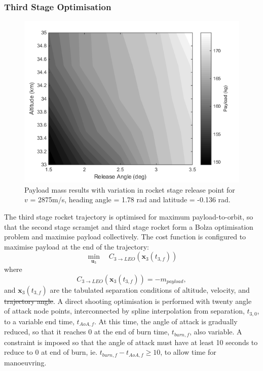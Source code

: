 \documentclass[journal]{new-aiaa}
\providecommand{\DIFadd}[1]{{\protect\color{blue}\uwave{#1}}} %
\providecommand{\DIFdel}[1]{{\protect\color{red}\sout{#1}}}                      %
\providecommand{\DIFaddbegin}{} %
\providecommand{\DIFaddend}{} %
\providecommand{\DIFdelbegin}{} %
\providecommand{\DIFdelend}{} %
\newcommand{\DIFscaledelfig}{0.5}
\newlength{\DIFdelgraphicswidth} %
\newlength{\DIFdelgraphicsheight} %
\newcommand{\DIFaddincludegraphics}[2][]{{\color{blue}\fbox{\DIFOincludegraphics[#1]{#2}}}} %
\newcommand{\DIFdelincludegraphics}[2][]{%
\sbox{\DIFdelgraphicsbox}{\DIFOincludegraphics[#1]{#2}}%
\settoboxwidth{\DIFdelgraphicswidth}{\DIFdelgraphicsbox} %
\settoboxtotalheight{\DIFdelgraphicsheight}{\DIFdelgraphicsbox} %
\scalebox{\DIFscaledelfig}{%
\parbox[b]{\DIFdelgraphicswidth}{\usebox{\DIFdelgraphicsbox}\\[-\baselineskip] \rule{\DIFdelgraphicswidth}{0em}}\llap{\resizebox{\DIFdelgraphicswidth}{\DIFdelgraphicsheight}{%
\setlength{\unitlength}{\DIFdelgraphicswidth}%
\begin{picture}(1,1)%
\thicklines\linethickness{2pt} %
{\color[rgb]{1,0,0}\put(0,0){\framebox(1,1){}}}%
{\color[rgb]{1,0,0}\put(0,0){\line( 1,1){1}}}%
{\color[rgb]{1,0,0}\put(0,1){\line(1,-1){1}}}%
\end{picture}%
}\hspace*{3pt}}} %
} %
\DeclareRobustCommand{\DIFaddbegin}{\DIFOaddbegin \let\includegraphics\DIFaddincludegraphics} %
\DeclareRobustCommand{\DIFaddend}{\DIFOaddend \let\includegraphics\DIFOincludegraphics} %
\DeclareRobustCommand{\DIFdelbegin}{\DIFOdelbegin \let\includegraphics\DIFdelincludegraphics} %
\DeclareRobustCommand{\DIFdelend}{\DIFOaddend \let\includegraphics\DIFOincludegraphics} %
\begin{document}
	 
	 
	  \subsubsection{Third Stage Optimisation} \label{section:thirdstage}

	   \begin{figure}[t]
	   	\begin{center}
	   		\includegraphics[width=0.6\linewidth]{contours}
	   		\caption{Payload mass results with variation in rocket stage release point for $v$ = 2875m/s, heading angle = 1.78 rad and latitude = -0.136 rad.}
	   		\label{fig:contours}
	   	\end{center}
	   \end{figure}

	  The third stage rocket trajectory is optimised for maximum payload-to-orbit, so that the second stage scramjet and third stage rocket form a Bolza optimisation problem and maximise payload collectively. The cost function is configured to maximise payload at the end of the trajectory:
	  \begin{equation} 
	  \min\limits_{\textbf{u}_3} \quad C_{3\rightarrow LEO}(\textbf{x}_{3}(t_{3,f})) 
	  \end{equation}
	  where
	  \begin{equation}
	  C_{3\rightarrow LEO}(\textbf{x}_{3}(t_{3,f})) = -m_{payload},
	  \end{equation}
	  and $\textbf{x}_{3}(t_{3,f})$ are the tabulated separation conditions of altitude, velocity, and \DIFdelbegin \DIFdel{trajectory angle}\DIFdelend \DIFaddbegin \DIFadd{\textcolor{red}{flight path angle}}\DIFaddend . A direct shooting optimisation is performed with twenty angle of attack node points, interconnected by spline interpolation from separation, $t_{3,0}$, to a variable end time, $t_{AoA,f}$. At this time, the angle of attack is gradually reduced, so that it reaches 0 at the end of burn time, $t_{burn,f}$, also variable.  A constraint is imposed so that the angle of attack must have at least 10 seconds to reduce to 0 at end of burn, ie. $t_{burn,f} - t_{AoA,f} \ge 10$, to allow time for manoeuvring.
\end{document}
